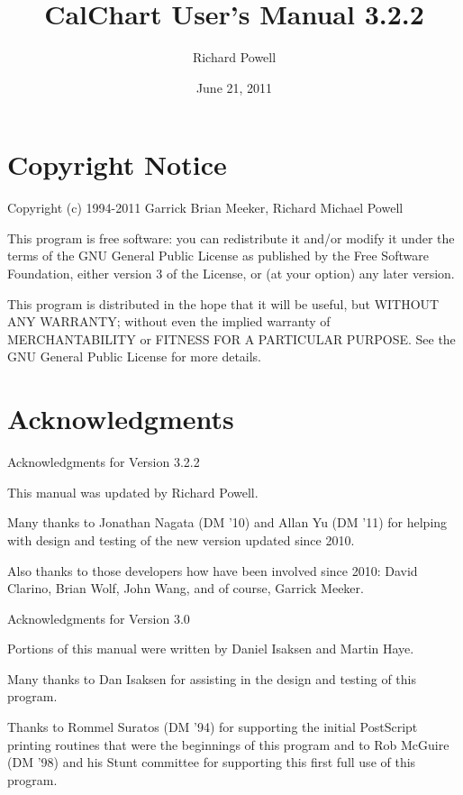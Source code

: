 \title{CalChart User's Manual 3.2.2}
\author{Richard Powell}
\date{June 21, 2011}
\makeindex

\maketitle
\tableofcontents

\chapter*{Copyright Notice}\label{copyright}

Copyright (c) 1994-2011  Garrick Brian Meeker, Richard Michael Powell

This program is free software: you can redistribute it and/or modify
it under the terms of the GNU General Public License as published by
the Free Software Foundation, either version 3 of the License, or
(at your option) any later version.

This program is distributed in the hope that it will be useful,
but WITHOUT ANY WARRANTY; without even the implied warranty of
MERCHANTABILITY or FITNESS FOR A PARTICULAR PURPOSE.  See the
GNU General Public License for more details.

\chapter*{Acknowledgments}\label{acknowledge}

Acknowledgments for Version 3.2.2

This manual was updated by Richard Powell.

Many thanks to Jonathan Nagata (DM '10) and Allan Yu (DM '11) for helping
with design and testing of the new version updated since 2010.

Also thanks to those developers how have been involved since 2010:
David Clarino, Brian Wolf, John Wang, and of course, Garrick Meeker.

Acknowledgments for Version 3.0

Portions of this manual were written by Daniel Isaksen and Martin Haye.

Many thanks to Dan Isaksen for assisting in the design and testing of
this program.

Thanks to Rommel Suratos (DM '94) for supporting the initial PostScript
printing routines that were the beginnings of this program and to Rob
McGuire (DM '98) and his Stunt committee for supporting this first full
use of this program.

